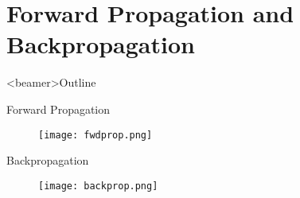 \section{Forward Propagation and Backpropagation}
\label{FBProp}

\begin{frame}<beamer>{Outline}
\end{frame}

\begin{frame}{Forward Propagation}

	\begin{figure}[!tbp]
	  \centering
	    \texttt{[image: fwdprop.png]}
	\end{figure}

\end{frame}

\begin{frame}{Backpropagation}

	\begin{figure}[!tbp]
	  \centering
	    \texttt{[image: backprop.png]}
	\end{figure}

\end{frame}